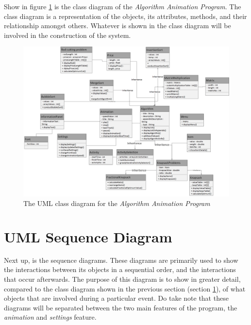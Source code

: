 Show in figure \ref{UMLClassDiagram} is the class diagram of the \textit{Algorithm Animation Program}. The class diagram is a representation of the objects, its attributes, methods, and their relationship amongst others. Whatever is shown in the class diagram will be involved in the construction of the system. 

\begin{landscape}
\begin{figure}[H]
\centering
\includegraphics[scale=.37]{images/report_images/UMLClassDiagram.png}
\caption{The UML class diagram for the \textit{Algorithm Animation Program}}
\label{UMLClassDiagram}
\end{figure}
\end{landscape}

\newpage

\section{UML Sequence Diagram}

Next up, is the sequence diagrams. These diagrams are primarily used to show the interactions between its objects in a sequential order, and the interactions that occur afterwards. The purpose of this diagram is to show in greater detail, compared to the class diagram shown in the previous section (section \ref{UMLClassDiagram}), of what objects that are involved during a particular event. Do take note that these diagrams will be separated between the two main features of the program, the \textit{animation} and \textit{settings} feature.


